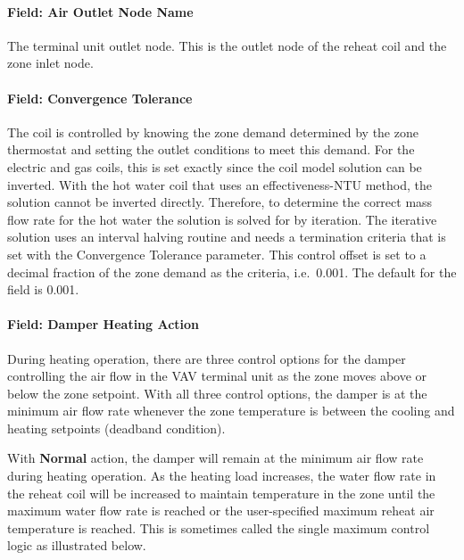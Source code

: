 \paragraph{Field: Air Outlet Node Name}\label{field-air-outlet-node-name-1}

The terminal unit outlet node. This is the outlet node of the reheat coil and the zone inlet node.

\paragraph{Field: Convergence Tolerance}\label{field-convergence-tolerance-1}

The coil is controlled by knowing the zone demand determined by the zone thermostat and setting the outlet conditions to meet this demand. For the electric and gas coils, this is set exactly since the coil model solution can be inverted. With the hot water coil that uses an effectiveness-NTU method, the solution cannot be inverted directly. Therefore, to determine the correct mass flow rate for the hot water the solution is solved for by iteration. The iterative solution uses an interval halving routine and needs a termination criteria that is set with the Convergence Tolerance parameter. This control offset is set to a decimal fraction of the zone demand as the criteria, i.e.~0.001. The default for the field is 0.001.

\paragraph{Field: Damper Heating Action}\label{field-damper-heating-action}

During heating operation, there are three control options for the damper controlling the air flow in the VAV terminal unit as the zone moves above or below the zone setpoint. With all three control options, the damper is at the minimum air flow rate whenever the zone temperature is between the cooling and heating setpoints (deadband condition).

With \textbf{Normal} action, the damper will remain at the minimum air flow rate during heating operation. As the heating load increases, the water flow rate in the reheat coil will be increased to maintain temperature in the zone until the maximum water flow rate is reached or the user-specified maximum reheat air temperature is reached. This is sometimes called the single maximum control logic as illustrated below.

